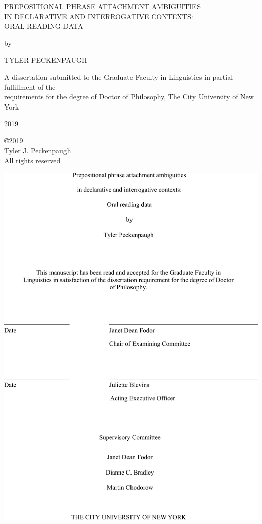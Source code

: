 \documentclass[11pt,oneside]{book}
\title{}
\author{}
\date{2019-09-16}
\begin{document}
\centering
{}
\vspace*{2.0in}

\uppercase{Prepositional phrase attachment ambiguities \\ in declarative and interrogative contexts: \\ Oral reading data}

\vspace{0.5in}

by

\vspace{0.5in}

\uppercase{Tyler Peckenpaugh}

\vfill 

A dissertation submitted to the Graduate Faculty in Linguistics in partial fulfillment of the \\ requirements for the degree of Doctor of Philosophy, The City University of New York 

\vspace{0.5in}

2019
\thispagestyle{empty}
\pagebreak

\setcounter{page}{2}
\vspace*{4in}
\vfill
\copyright 2019\\
Tyler J. Peckenpaugh\\
All rights reserved\\

\pagebreak

\includegraphics{approval-page2.pdf}
\end{document}
